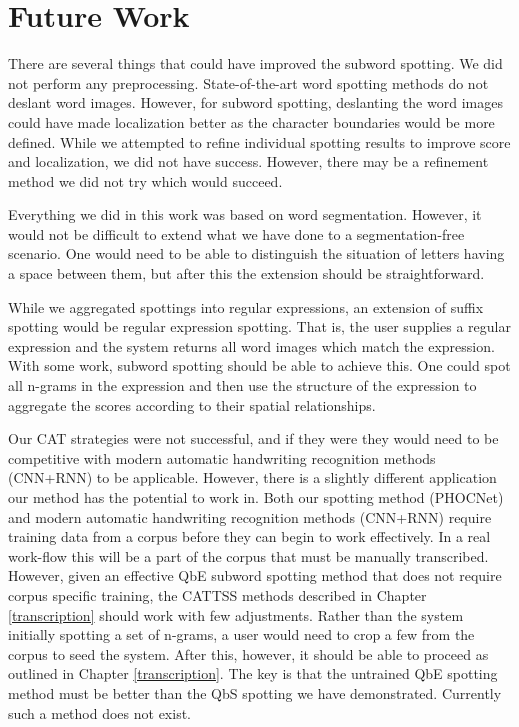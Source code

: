 \documentclass[ms,electronic,twosidetoc,letterpaper,chaptercenter,parttop,lof,lot]{byumsphd}
\begin{document}
\section{Future Work}



There are several things that could have improved the subword spotting. We did not perform any preprocessing. State-of-the-art word spotting methods do not deslant word images. However, for subword spotting, deslanting the word images could have made localization better as the character boundaries would be more defined. While we attempted to refine individual spotting results to improve score and localization, we did not have success. However, there may be a refinement method we did not try which would succeed.

Everything we did in this work was based on word segmentation. However, it would not be difficult to extend what we have done to a segmentation-free scenario. One would need to be able to distinguish the situation of letters having a space between them, but after this  the extension should be straightforward.

While we aggregated spottings into regular expressions, an extension of suffix spotting would be regular expression spotting. That is, the user supplies a regular expression and the system returns all word images which match the expression. With some work, subword spotting should be able to achieve this. One could spot all n-grams in the expression and then use the structure of the expression to aggregate the scores according to their spatial relationships.

Our CAT strategies were not successful, and if they were they would need to be competitive with modern automatic handwriting recognition methods (CNN+RNN) to be applicable. However, there is a slightly different application our method has the potential to work in.
Both our spotting method (PHOCNet) and modern automatic handwriting recognition methods (CNN+RNN) require training data from a corpus before they can begin to work effectively. In a real work-flow this will be a part of the corpus that must be manually transcribed. However, given an effective QbE subword spotting method that does not require corpus specific training, the CATTSS methods described in Chapter \ref{transcription} should work with few adjustments. Rather than the system initially spotting a set of n-grams, a user would need to crop a few from the corpus to seed the system. After this, however, it should be able to proceed as outlined in Chapter \ref{transcription}.
The key is that the untrained QbE spotting method must be better than the QbS spotting we have demonstrated. Currently such a method does not exist.
\end{document}
